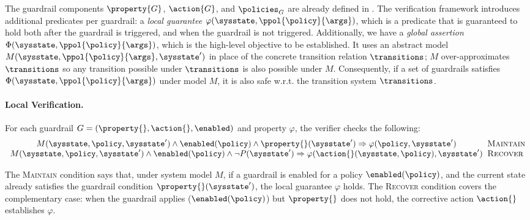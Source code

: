 The guardrail components $\property{G}$, $\action{G}$, and $\policies_G$ are already defined in .
The verification framework introduces additional predicates per guardrail: a \emph{local guarantee} $\varphi(\sysstate,\ppol{\policy}{\args})$, which is a predicate that is guaranteed to hold both after the guardrail is triggered, and when the guardrail is not triggered. Additionally, we have a \emph{global \perfsafety assertion} $\Phi(\sysstate,\ppol{\policy}{\args})$, which is the high-level objective to be established.
It uses an abstract model $M(\sysstate,\ppol{\policy}{\args},\sysstate')$ in place of the concrete transition relation $\transitions$; $M$ over-approximates $\transitions$ so any transition possible under $\transitions$ is also possible under $M$. Consequently, if a set of guardrails satisfies $\Phi(\sysstate, \ppol{\policy}{\args})$ under model $M$, it is also safe w.r.t. the transition system $\transitions$.

\paragraph{Local Verification.}
For each guardrail $G = (\property{}, \action{}, \enabled)$ and property $\varphi$, the verifier checks the following:
\[
\begin{array}{c@{\;\;}l}
M(\sysstate, \policy, \sysstate') \wedge \enabled(\policy) \wedge \property{}(\sysstate') \Rightarrow \varphi(\policy, \sysstate') & \textsc{Maintain} \\
M(\sysstate,\policy, \sysstate') \wedge \enabled(\policy) \wedge \neg P(\sysstate') 
\Rightarrow \varphi(\action{}(\sysstate, \policy), \sysstate')
& 
\textsc{Recover}
\end{array}
\]


The \textsc{Maintain} condition says that, under system model $M$, if a guardrail is enabled for a policy $\enabled(\policy)$, and the current state already satisfies the guardrail condition $\property{}(\sysstate')$, the local guarantee $\varphi$ holds.
The \textsc{Recover} condition covers the complementary case: when the guardrail applies ($\enabled(\policy)$) but $\property{}$ does not hold, the corrective action $\action{}$ establishes $\varphi$.

